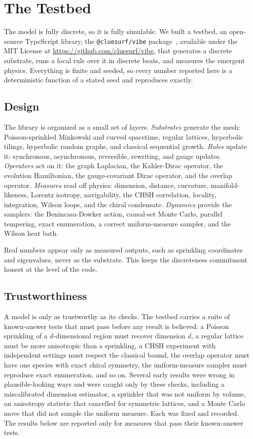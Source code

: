 \section{The Testbed}
\label{sec:testbed}

The model is fully discrete, so it is fully simulable. We built a testbed, an open-source TypeScript library, the \texttt{@cluesurf/vibe} package~\cite{pollard2026vibetest}, available under the MIT License at \url{https://github.com/cluesurf/vibe}, that generates a discrete substrate, runs a local rule over it in discrete beats, and measures the emergent physics. Everything is finite and seeded, so every number reported here is a deterministic function of a stated seed and reproduces exactly.

\subsection{Design}

The library is organized as a small set of layers. \emph{Substrates} generate the mesh: Poisson-sprinkled Minkowski and curved spacetime, regular lattices, hyperbolic tilings, hyperbolic random graphs, and classical sequential growth. \emph{Rules} update it: synchronous, asynchronous, reversible, rewriting, and gauge updates. \emph{Operators} act on it: the graph Laplacian, the Kahler-Dirac operator, the evolution Hamiltonian, the gauge-covariant Dirac operator, and the overlap operator. \emph{Measures} read off physics: dimension, distance, curvature, manifold-likeness, Lorentz isotropy, navigability, the CHSH correlation, locality, integration, Wilson loops, and the chiral condensate. \emph{Dynamics} provide the samplers: the Benincasa-Dowker action, causal-set Monte Carlo, parallel tempering, exact enumeration, a correct uniform-measure sampler, and the Wilson heat bath.

Real numbers appear only as measured outputs, such as sprinkling coordinates and eigenvalues, never as the substrate. This keeps the discreteness commitment honest at the level of the code.

\subsection{Trustworthiness}

A model is only as trustworthy as its checks. The testbed carries a suite of known-answer tests that must pass before any result is believed: a Poisson sprinkling of a $d$-dimensional region must recover dimension $d$, a regular lattice must be more anisotropic than a sprinkling, a CHSH experiment with independent settings must respect the classical bound, the overlap operator must have one species with exact chiral symmetry, the uniform-measure sampler must reproduce exact enumeration, and so on. Several early results were wrong in plausible-looking ways and were caught only by these checks, including a miscalibrated dimension estimator, a sprinkler that was not uniform by volume, an anisotropy statistic that cancelled for symmetric lattices, and a Monte Carlo move that did not sample the uniform measure. Each was fixed and recorded. The results below are reported only for measures that pass their known-answer tests.


